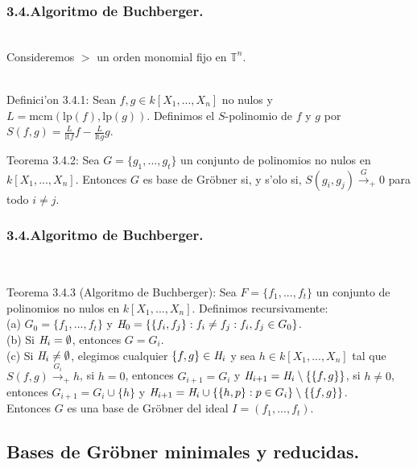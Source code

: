 \documentclass[10pt]{beamer}
\renewcommand{\T}{\mathbb{T}^n}
\renewcommand{\lp}{\text{lp}}
\renewcommand{\lt}{\text{lt}}
\begin{document}
\begin{frame}
\frametitle{3.4.Algoritmo de Buchberger.}\\
Consideremos $>$ un orden monomial fijo en $\T$.\\
\\
\begin{block}{Definici'on 3.4.1:}
Sean $f,g \in k[X_1,...,X_n]$ no nulos y $L=\text{mcm}(\lp (f),\lp (g))$. Definimos el $S$-polinomio de $f$ y $g$ por $S(f,g)=\frac{L}{\lt{f}}f- \frac{L}{\lt{g}}g$.\\
\end{block}
\begin{block}{Teorema 3.4.2:}
Sea $G=\{g_1,...,g_t\}$ un conjunto de polinomios no nulos en $k[X_1,...,X_n]$. Entonces $G$ es base de Gr\"obner si, y s'olo si, $S(g_i,g_j) {\overset{G}{\longrightarrow}}_{+} 0$ para todo $i \not = j$.\\
\end{block}
\vspace{5cm}
\end{frame}






\begin{frame}
\frametitle{3.4.Algoritmo de Buchberger.}\\
\begin{block}{Teorema 3.4.3 (Algoritmo de Buchberger):}
Sea $F=\{f_1,...,f_t\}$ un conjunto de polinomios no nulos en $k[X_1,...,X_n]$. Definimos recursivamente:\\
(a) $G_0=\{f_1,...,f_t\}$ y $\emph{H}_{0}=\{\{f_i,f_j \}:f_i \not = f_j:f_i,f_j \in G_0\}$.\\
(b) Si $\emph{H}_{i} = \emptyset$, entonces $G=G_i$.\\
(c) Si $\emph{H}_{i} \not = \emptyset$, elegimos cualquier $\{f,g\} \in \emph{H}_{i}$ y sea $h \in k[X_1,...,X_n]$ tal que $S(f,g) \overset{G_i}{\longrightarrow}_{+}h$, si $h=0$, entonces $G_{i+1}=G_i$ y $\emph{H}_{i+1}=\emph{H}_{i}\setminus \{\{f,g\}\}$, si $h \not = 0$, entonces $G_{i+1}=G_i \cup \{h\}$ y $\emph{H}_{i+1}=\emph{H}_i\cup \{\{h,p\}:p \in G_i\} \setminus \{\{f,g\}\}$.\\
 Entonces $G$ es una base de Gr\"obner del ideal $I=(f_1,...,f_t)$.\\ 
\end{block}
\vspace{6cm}
\end{frame}




\subsection{Bases de Gr\"obner minimales y reducidas.}\\
\end{document}
